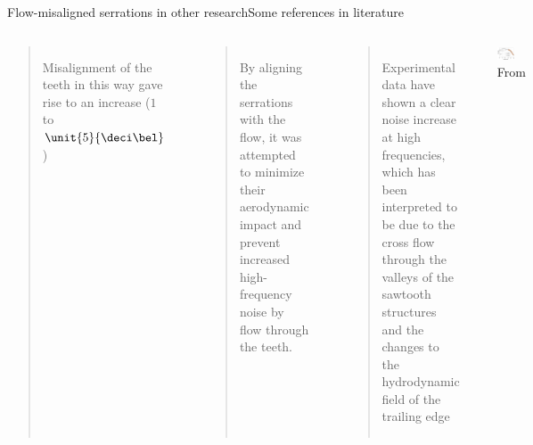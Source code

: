 \documentclass[xcolor=table,aspectratio=169]{beamer}
\begin{document}
\begin{frame}[b]{Flow-misaligned serrations in other research}{Some references in literature}
   \begin{columns}

      \scriptsize{
         \begin{quote}
             Misalignment of the teeth in this way gave rise to an \textcolor<1-2>{LMLightBlue}{increase} ($1$ to $\unit{5}{\deci\bel}$)
         \end{quote}
         \vspace{-9mm}
         \begin{flushright}
            \cite{Dassen1996}
         \end{flushright}
         \vspace{-2mm}
         \begin{quote}
             By aligning the serrations with the flow, it was attempted to minimize their aerodynamic impact and prevent \textcolor<1-2>{LMLightBlue}{increased high-frequency noise} by \alert<2>{flow through the teeth}.
         \end{quote}
         \vspace{-6mm}
         \begin{flushright}
            \cite{oerlemans2009reduction}
         \end{flushright}
         \vspace{-2mm}
         \begin{quote}
             Experimental data have shown a clear noise \textcolor<1-2>{LMLightBlue}{increase at high frequencies}, which has been interpreted to be \alert<2>{due to the cross flow through the valleys of the sawtooth structures} and the changes to the hydrodynamic field of the trailing edge
         \end{quote}
         \vspace{-6mm}
         \begin{flushright}
            \cite{Gruber2012}
         \end{flushright}
      }

      \vspace{0mm}
         \begin{flushright}
            \includegraphics[width=0.6\textwidth]{./media/SerrationIncrease_oerlemans2009reduction.png}\newline
            \tiny From \cite{oerlemans2009reduction}
         \end{flushright}


\end{columns}
\end{frame}
\end{document}
